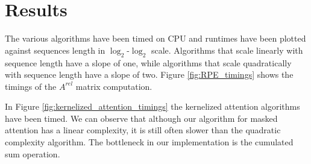 \section{Results}

The various algorithms have been timed on CPU and runtimes have been plotted against sequences length in $\log_2$-$\log_2$ scale. Algorithms that scale linearly with sequence length have a slope of one, while algorithms that scale quadratically with sequence length have a slope of two. Figure \ref{fig:RPE_timings} shows the timings of the $A^{rel}$ matrix computation.

In Figure \ref{fig:kernelized_attention_timings} the kernelized attention algorithms have been timed. We can observe that although our algorithm for masked attention has a linear complexity, it is still often slower than the quadratic complexity algorithm. The bottleneck in our implementation\citep{favier2022} is the cumulated sum operation.

\endinput
favier2022